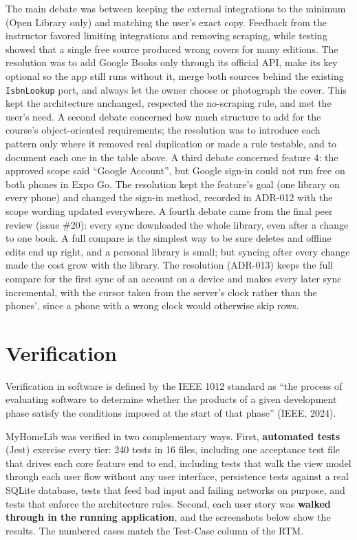 \documentclass[12pt]{article}
\begin{document}
The main debate was between keeping the external integrations to the minimum (Open Library only) and matching the user's exact copy. Feedback from the instructor favored limiting integrations and removing scraping, while testing showed that a single free source produced wrong covers for many editions. The resolution was to add Google Books only through its official API, make its key optional so the app still runs without it, merge both sources behind the existing \texttt{IsbnLookup} port, and always let the owner choose or photograph the cover. This kept the architecture unchanged, respected the no-scraping rule, and met the user's need. A second debate concerned how much structure to add for the course's object-oriented requirements; the resolution was to introduce each pattern only where it removed real duplication or made a rule testable, and to document each one in the table above. A third debate concerned feature 4: the approved scope said ``Google Account'', but Google sign-in could not run free on both phones in Expo Go. The resolution kept the feature's goal (one library on every phone) and changed the sign-in method, recorded in ADR-012 with the scope wording updated everywhere. A fourth debate came from the final peer review (issue \#20): every sync downloaded the whole library, even after a change to one book. A full compare is the simplest way to be sure deletes and offline edits end up right, and a personal library is small; but syncing after every change made the cost grow with the library. The resolution (ADR-013) keeps the full compare for the first sync of an account on a device and makes every later sync incremental, with the cursor taken from the server's clock rather than the phones', since a phone with a wrong clock would otherwise skip rows.

\section{Verification}
\label{sec:verification}

Verification in software is defined by the IEEE 1012 standard as ``the process of evaluating software to determine whether the products of a given development phase satisfy the conditions imposed at the start of that phase'' (IEEE, 2024).

MyHomeLib was verified in two complementary ways. First, \textbf{automated tests} (Jest) exercise every tier: 240 tests in 16 files, including one acceptance test file that drives each core feature end to end, including tests that walk the view model through each user flow without any user interface, persistence tests against a real SQLite database, tests that feed bad input and failing networks on purpose, and tests that enforce the architecture rules. Second, each user story was \textbf{walked through in the running application}, and the screenshots below show the results. The numbered cases match the Test-Case column of the RTM.
\end{document}
